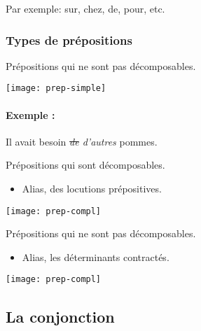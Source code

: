\documentclass[10pt, french]{article}
\begin{document}
\begin{multicols*}{2}
\begin{definitionNOHFILL}[La préposition]
\tcbline

Par exemple:	sur, chez, de, pour, etc.
\end{definitionNOHFILL}

\subsubsection*{Types de prépositions}
\begin{definitionNOHFILLsub}
Prépositions qui ne sont pas décomposables.
\begin{center}
	\texttt{[image: prep-simple]}
\end{center}
\begin{astuces}
\paragraph{Exemple :}	Il avait besoin \textit{\sout{de} d'autres} pommes.
\end{astuces}
\end{definitionNOHFILLsub}

\begin{definitionNOHFILLsub}
Prépositions qui sont décomposables.
\begin{itemize}
	\item	Alias, des locutions prépositives.
\end{itemize}
\begin{center}
	\texttt{[image: prep-compl]}
\end{center}
\end{definitionNOHFILLsub}

\begin{definitionNOHFILLsub}
Prépositions qui ne sont pas décomposables.
\begin{itemize}
	\item	Alias, les déterminants contractés.
\end{itemize}
\begin{center}
	\texttt{[image: prep-compl]}
\end{center}

\end{definitionNOHFILLsub}


\columnbreak
\subsection{La conjonction}\label{sec:classes-conjun}



\end{multicols*}
\end{document}
